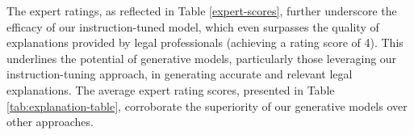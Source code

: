 The expert ratings, as reflected in Table \ref{expert-scores}, further underscore the efficacy of our instruction-tuned model, which even surpasses the quality of explanations provided by legal professionals (achieving a rating score of 4). This underlines the potential of generative models, particularly those leveraging our instruction-tuning approach, in generating accurate and relevant legal explanations. The average expert rating scores, presented in Table \ref{tab:explanation-table}, corroborate the superiority of our generative models over other approaches.


\begin{table}[t]
\centering
{}
\caption{Distribution of Expert Rating Scores for Generative Models on PredEx and ILDC Expert Data.}
\label{expert-scores}
\end{table}
